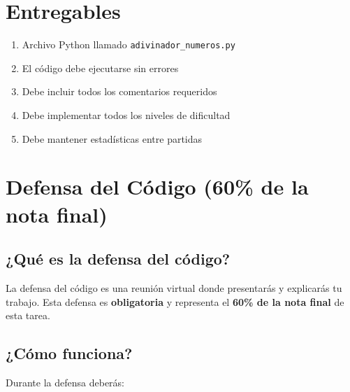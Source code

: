 \documentclass[12pt,a4paper]{article}
\begin{document}
\section{Entregables}

\begin{enumerate}[leftmargin=*]
    \item Archivo Python llamado \texttt{adivinador\_numeros.py}
    \item El código debe ejecutarse sin errores
    \item Debe incluir todos los comentarios requeridos
    \item Debe implementar todos los niveles de dificultad
    \item Debe mantener estadísticas entre partidas
\end{enumerate}

\section{Defensa del Código (60\% de la nota final)}

\subsection{¿Qué es la defensa del código?}

La defensa del código es una reunión virtual donde presentarás y explicarás tu trabajo. Esta defensa es \textbf{obligatoria} y representa el \textbf{60\% de la nota final} de esta tarea.

\subsection{¿Cómo funciona?}

Durante la defensa deberás:
\end{document}
